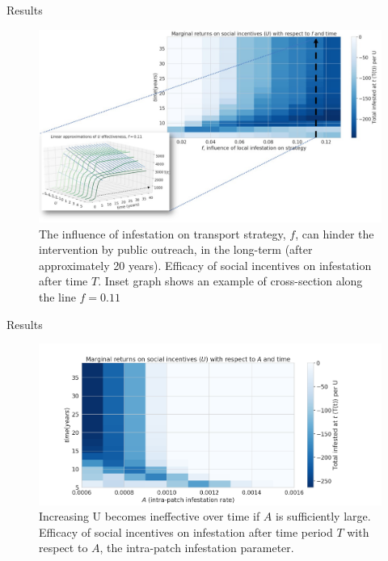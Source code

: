 \documentclass{beamer}
\begin{document}
\begin{frame}{Results}
    \begin{figure}
        \includegraphics[width=\textwidth]{firewood/p1.jpg}
        \caption{\small The influence of infestation on transport strategy, $f$, can hinder the intervention by public outreach, in the long-term (after approximately 20 years). Efficacy of social incentives on infestation after time $T$. Inset graph shows an example of cross-section along the line $f = 0.11$}
    \end{figure}
\end{frame}

\begin{frame}{Results}
    \begin{figure}
        \includegraphics[width=\textwidth]{firewood/A_v_time.png}
        \caption{Increasing U becomes ineffective over time if $A$ is sufficiently large. Efficacy of social incentives on infestation after time period $T$ with respect to $A$, the intra-patch infestation parameter.}
    \end{figure}
\end{frame}
\end{document}
